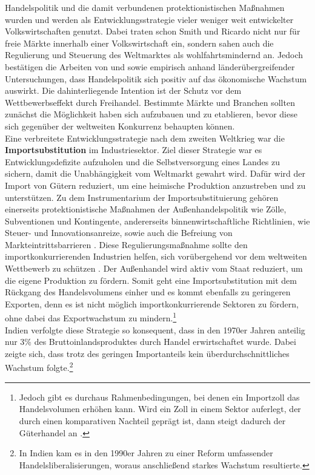 %
Handelspolitik und die damit verbundenen protektionistischen Maßnahmen wurden und werden als Entwicklungsstrategie vieler weniger weit entwickelter Volkswirtschaften genutzt. Dabei traten schon Smith und Ricardo nicht nur für freie Märkte innerhalb einer Volkswirtschaft ein, sondern sahen auch die Regulierung und Steuerung des Weltmarktes als wohlfahrtsmindernd an. Jedoch bestätigen die Arbeiten von \cite{Dollar.1992,BenDavid.1993,Sachs.1995,Frankel.1999} und \cite{Edwards.1993} sowie \cite{RodriguezCaballero.2000} empirisch anhand länderübergreifender Untersuchungen, dass Handelspolitik sich positiv auf das ökonomische Wachstum auswirkt. Die dahinterliegende Intention ist der Schutz vor dem Wettbewerbseffekt durch Freihandel. Bestimmte Märkte und Branchen sollten zunächst die Möglichkeit haben sich aufzubauen und zu etablieren, bevor diese sich gegenüber der weltweiten Konkurrenz behaupten können. \\
%
Eine verbreitete Entwicklungsstrategie nach dem zweiten Weltkrieg war die \textbf{Importsubstitution} im Industriesektor. Ziel dieser Strategie war es Entwicklungsdefizite aufzuholen und die Selbstversorgung eines Landes zu sichern, damit die Unabhängigkeit vom Weltmarkt gewahrt wird. Dafür wird der Import von Gütern reduziert, um eine heimische Produktion anzustreben und zu unterstützen. Zu dem Instrumentarium der Importsubstituierung gehören einerseits protektionistische Maßnahmen der Außenhandelspolitik wie Zölle, Subventionen und Kontingente, andererseits binnenwirtschaftliche Richtlinien, wie Steuer- und Innovationsanreize, sowie auch die Befreiung von Markteintrittsbarrieren \cite{Muller.2005,Lachmann.1994}. Diese Regulierungsmaßnahme sollte den importkonkurrierenden Industrien helfen, sich vorübergehend vor dem weltweiten Wettbewerb zu schützen \cite{Lewis.1955}. Der Außenhandel wird aktiv vom Staat reduziert, um die eigene Produktion zu fördern. Somit geht eine Importsubstitution mit dem Rückgang des Handelsvolumens einher und es kommt ebenfalls zu geringeren Exporten, denn es ist nicht möglich importkonkurrierende Sektoren zu fördern, ohne dabei das Exportwachstum zu mindern.\footnote{Jedoch gibt es durchaus Rahmenbedingungen, bei denen ein Importzoll das Handelsvolumen erhöhen kann. Wird ein Zoll in einem Sektor auferlegt, der durch einen komparativen Nachteil geprägt ist, dann steigt dadurch der Güterhandel an \cite{Lancaster.1980}.}\\
%
Indien verfolgte diese Strategie so konsequent, dass in den 1970er Jahren anteilig nur 3{\%} des Bruttoinlandsproduktes durch Handel erwirtschaftet wurde. Dabei zeigte sich, dass trotz des geringen Importanteils kein überdurchschnittliches Wachstum folgte.\footnote{In Indien kam es in den 1990er Jahren zu einer Reform umfassender Handelsliberalisierungen, woraus anschließend starkes Wachstum resultierte.}
